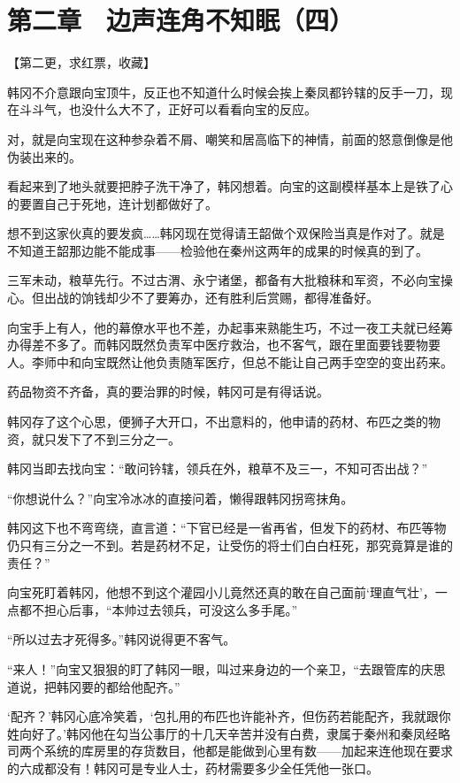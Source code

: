 \section{第二章　边声连角不知眠（四）}

【第二更，求红票，收藏】

韩冈不介意跟向宝顶牛，反正也不知道什么时候会挨上秦凤都钤辖的反手一刀，现在斗斗气，也没什么大不了，正好可以看看向宝的反应。

对，就是向宝现在这种参杂着不屑、嘲笑和居高临下的神情，前面的怒意倒像是他伪装出来的。

看起来到了地头就要把脖子洗干净了，韩冈想着。向宝的这副模样基本上是铁了心的要置自己于死地，连计划都做好了。

想不到这家伙真的要发疯……韩冈现在觉得请王韶做个双保险当真是作对了。就是不知道王韶那边能不能成事——检验他在秦州这两年的成果的时候真的到了。

三军未动，粮草先行。不过古渭、永宁诸堡，都备有大批粮秣和军资，不必向宝操心。但出战的饷钱却少不了要筹办，还有胜利后赏赐，都得准备好。

向宝手上有人，他的幕僚水平也不差，办起事来熟能生巧，不过一夜工夫就已经筹办得差不多了。而韩冈既然负责军中医疗救治，也不客气，跟在里面要钱要物要人。李师中和向宝既然让他负责随军医疗，但总不能让自己两手空空的变出药来。

药品物资不齐备，真的要治罪的时候，韩冈可是有得话说。

韩冈存了这个心思，便狮子大开口，不出意料的，他申请的药材、布匹之类的物资，就只发下了不到三分之一。

韩冈当即去找向宝：“敢问钤辖，领兵在外，粮草不及三一，不知可否出战？”

“你想说什么？”向宝冷冰冰的直接问着，懒得跟韩冈拐弯抹角。

韩冈这下也不弯弯绕，直言道：“下官已经是一省再省，但发下的药材、布匹等物仍只有三分之一不到。若是药材不足，让受伤的将士们白白枉死，那究竟算是谁的责任？”

向宝死盯着韩冈，他想不到这个灌园小儿竟然还真的敢在自己面前‘理直气壮’，一点都不担心后事，“本帅过去领兵，可没这么多手尾。”

“所以过去才死得多。”韩冈说得更不客气。

“来人！”向宝又狠狠的盯了韩冈一眼，叫过来身边的一个亲卫，“去跟管库的庆思道说，把韩冈要的都给他配齐。”

‘配齐？’韩冈心底冷笑着，‘包扎用的布匹也许能补齐，但伤药若能配齐，我就跟你姓向好了。’韩冈他在勾当公事厅的十几天辛苦并没有白费，隶属于秦州和秦凤经略司两个系统的库房里的存货数目，他都是能做到心里有数——加起来连他现在要求的六成都没有！韩冈可是专业人士，药材需要多少全任凭他一张口。


